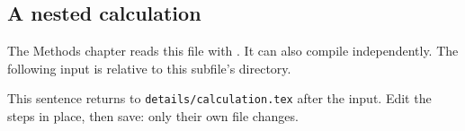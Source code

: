 \documentclass[../main.tex]{subfiles}
\begin{document}
\subsection{A nested calculation}
The Methods chapter reads this file with
\verb||. It can also compile independently.
The following input is relative to this subfile's directory.



This sentence returns to \texttt{details/calculation.tex} after the input.
Edit the steps in place, then save: only their own file changes.
\end{document}

